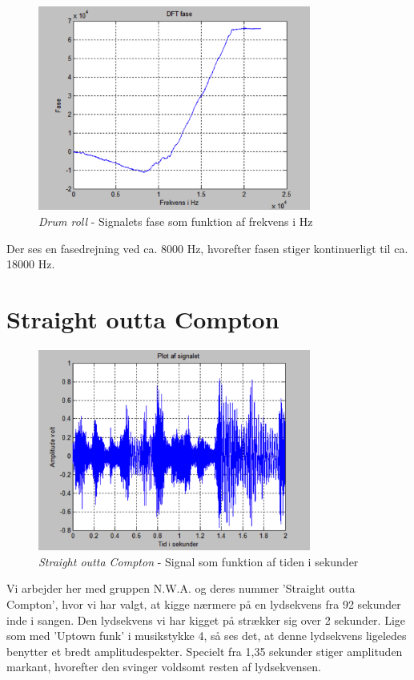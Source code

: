 \begin{figure}[H]
	\centering
	\includegraphics[width=0.8\textwidth]{Figurer/Snip20151001_15}
	\caption{\textit{Drum roll} - Signalets fase som funktion af frekvens i Hz}
\end{figure} 

Der ses en fasedrejning ved ca. 8000 Hz, hvorefter fasen stiger kontinuerligt til ca. 18000 Hz.

\section{Straight outta Compton}

\begin{figure}[H]
	\centering
	\includegraphics[width=0.8\textwidth]{Figurer/Snip20151001_16}
	\caption{\textit{Straight outta Compton} - Signal som funktion af tiden i sekunder}
\end{figure}

Vi arbejder her med gruppen N.W.A. og deres nummer 'Straight outta Compton', hvor vi har valgt, at kigge nærmere på en lydsekvens fra 92 sekunder inde i sangen. Den lydsekvens vi har kigget på strækker sig over 2 sekunder. Lige som med 'Uptown funk' i musikstykke 4, så ses det, at denne lydsekvens ligeledes benytter et bredt amplitudespekter. Specielt fra 1,35 sekunder stiger amplituden markant, hvorefter den svinger voldsomt resten af lydsekvensen.

